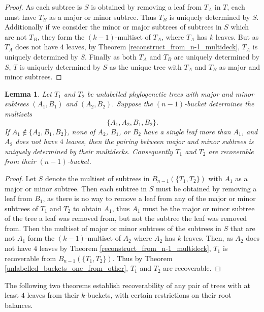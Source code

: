 \documentclass[12pt]{article}
\newtheorem{Lemma}[Theorem]{Lemma}
\theoremstyle{definition}
\begin{document}
\begin{proof}
    As each subtree is $S$ is obtained by removing a leaf from $T_A$ in $T$, each must have $T_B$ as a major or minor subtree. Thus $T_B$ is uniquely determined by $S$. Additionally if we consider the minor or major subtrees of subtrees in $S$ which are not $T_B$, they form the $(k-1)$-multiset of $T_A$, where $T_A$ has $k$ leaves. But as $T_A$ does not have $4$ leaves, by Theorem \ref{reconstruct_from_n-1_multideck}, $T_A$ is uniquely determined by $S$. Finally as both $T_A$ and $T_B$ are uniquely determined by $S$, $T$ is uniquely determined by $S$ as the unique tree with $T_A$ and $T_B$ as major and minor subtrees.
\end{proof}
\begin{Lemma}\label{recover_from_pendant_subtrees}
Let $T_1$ and $T_2$ be unlabelled phylogenetic trees with major and minor subtrees $(A_1,B_1)$ and $(A_2,B_2)$. Suppose the $(n-1)$-bucket determines the multisets
\[
\{A_1,A_2,B_1,B_2\}.
\]
If $A_1 \notin \{A_2, B_1, B_2\}$, none of $A_2$, $B_1$, or $B_2$ have a single leaf more than $A_1$, and $A_2$ does not have $4$ leaves, then the pairing between major and minor subtrees is uniquely determined by their multidecks.
Consequently $T_1$ and $T_2$ are recoverable from their $(n-1)$-bucket.
\end{Lemma}
\begin{proof}
    Let $S$ denote the multiset of subtrees in $B_{n-1}(\{T_1, T_2\})$ with $A_1$ as a major or minor subtree. Then each subtree in $S$ must be obtained by removing a leaf from $B_1$, as there is no way to remove a leaf from any of the major or minor subtrees of $T_1$ and $T_2$ to obtain $A_1$, thus $A_1$ must be the major or minor subtree of the tree a leaf was removed from, but not the subtree the leaf was removed from. Then the multiset of major or minor subtrees of the subtrees in $S$ that are not $A_1$ form the $(k-1)$-multiset of $A_2$ where $A_2$ has $k$ leaves. Then, as $A_2$ does not have $4$ leaves by Theorem \ref{reconstruct_from_n-1_multideck}, $T_1$ is recoverable from $B_{n-1}(\{T_1, T_2\})$. Thus by Theorem \ref{unlabelled_buckets_one_from_other}, $T_1$ and $T_2$ are recoverable.
\end{proof}

The following two theorems establish recoverability of any pair of trees with at least $4$ leaves from their $k$-buckets, with certain restrictions on their root balances.
\end{document}
